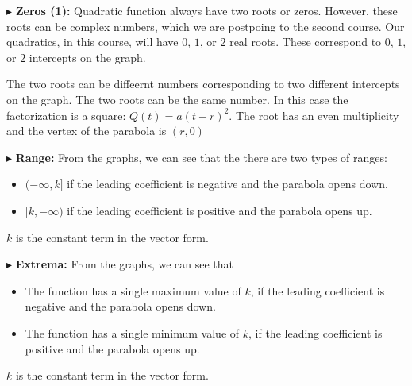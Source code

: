 \documentclass{ximera}
\begin{document}
\begin{image}
\end{image}





$\blacktriangleright$ \textbf{Zeros (1):}  Quadratic function always have two roots or zeros.  However, these roots can be complex numbers, which we are postpoing to the second course.  Our quadratics, in this course, will have $0$, $1$, or $2$ real roots.  These correspond to  $0$, $1$, or $2$ intercepts on the graph.

The two roots can be diffeernt numbers corresponding to two different intercepts on the graph.  The two roots can be the same number.  In this case the factorization is a square: $Q(t) = a(t-r)^2$.  The root has an even multiplicity and the vertex of the parabola is $(r, 0)$



$\blacktriangleright$ \textbf{Range:} From the graphs, we can see that the there are two types of ranges: 
\begin{itemize}
\item $(-\infty, k]$ if the leading coefficient is negative and the parabola opens down.
\item $[k, -\infty)$ if the leading coefficient is positive and the parabola opens up.
\end{itemize}

$k$ is the constant term in the vector form.



$\blacktriangleright$ \textbf{Extrema:} From the graphs, we can see that 
\begin{itemize}
\item The function has a single maximum value of $k$, if the leading coefficient is negative and the parabola opens down.
\item The function has a single minimum value of $k$, if the leading coefficient is positive and the parabola opens up.
\end{itemize}

$k$ is the constant term in the vector form.
\end{document}
